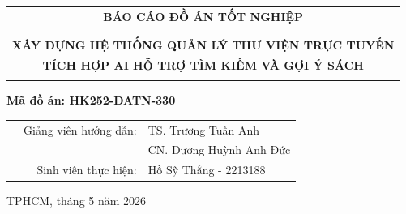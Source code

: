 \documentclass[a4paper]{report}
\begin{document}
\begin{titlepage}
    \begin{center}
    \begin{tabular}{c}
    \textbf{\Large BÁO CÁO ĐỒ ÁN TỐT NGHIỆP}\\
    \\
    \hline
    \\
    \textbf{\large{XÂY DỰNG HỆ THỐNG QUẢN LÝ THƯ VIỆN TRỰC TUYẾN}} \\
    \textbf{\large{TÍCH HỢP AI HỖ TRỢ TÌM KIẾM VÀ GỢI Ý SÁCH}}\\
    \vspace{0.5cm}
    \textbf{\huge }\\
    \hline
    \end{tabular}
    \end{center}

    \vspace{1cm}
    \begin{center}
        \textbf{\large Mã đồ án: HK252-DATN-330} \\
    \end{center}
    \vspace{2cm}

    \begin{table}[h]
        \centering
        \begin{tabular}{rrl}
             & Giảng viên hướng dẫn: & TS. Trương Tuấn Anh \\
             &                       & CN. Dương Huỳnh Anh Đức \\
             & Sinh viên thực hiện:  & Hồ Sỹ Thắng - 2213188\\
        \end{tabular}
    \end{table}

    \vspace{2cm}
    \begin{center}
    {\footnotesize TPHCM, tháng 5 năm 2026}
    \end{center}
\end{titlepage}

\newpage

\newpage

\newpage
\tableofcontents
\newpage

\cleardoublepage
\hypersetup{pageanchor=true}
\pagestyle{fancy}
\setcounter{page}{1}










\newpage
{}
\renewcommand{\bibname}{Tài liệu tham khảo} %

\nocite{*}
\end{document}
